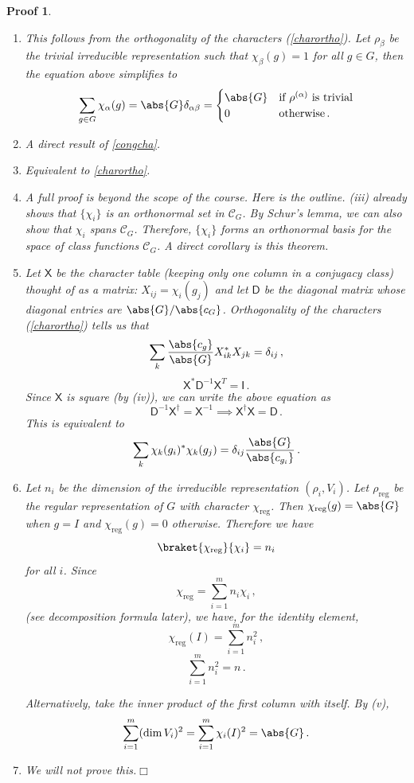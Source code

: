 \documentclass{article}
\theoremstyle{plain}\theoremheaderfont{\normalfont\itshape}\theorembodyfont{\rmfamily}\theoremseparator{.}\newtheorem*{rem}{Remark}\newtheorem*{ex}{Example}\newtheorem*{proof}{Proof}\newtheorem*{altp}{Alternative proof}
\theoremstyle{plain}\theoremheaderfont{\normalfont\bfseries}\theorembodyfont{\rmfamily}\theoremseparator{.}\newtheorem{thm}{Theorem}[section]\newtheorem{lem}[thm]{Lemma}\newtheorem{prop}[thm]{Proposition}\newtheorem*{cor}{Corollary}\newtheorem{defn}[thm]{Definition}\newtheorem{clm}[thm]{Claim}\newtheorem{clminproof}{Claim}
\theoremstyle{break}\theoremheaderfont{\normalfont\itshape}\theorembodyfont{\rmfamily}\theoremseparator{.\medskip}\newtheorem*{proofskip}{Proof}\newtheorem*{exs}{Examples}\newtheorem*{rems}{Remarks}
\theoremstyle{break}\theoremheaderfont{\normalfont\bfseries}\theorembodyfont{\rmfamily}\theoremseparator{.\medskip}\newtheorem{lemskip}[thm]{Lemma}\newtheorem{defnskip}[thm]{Definition}\newtheorem{propskip}[thm]{Proposition}\newtheorem{thmskip}[thm]{Theorem}
\numberwithin{equation}{section}
\newcommand{\qed}{\hfill\ensuremath{\Box}}
\begin{document}
	\begin{proofskip}
		\begin{enumerate}[topsep=0pt]
			\item This follows from the orthogonality of the characters (\cref{charortho}). Let \(\rho_\beta\) be the trivial irreducible representation such that \(\chi_\beta(g)=1\) for all \(g\in G\), then the equation above simplifies to
			\[\sum_{g\in G}\chi_\alpha(g)=\abs{G}\delta_{\alpha\beta}=\begin{cases}
				\abs{G} & \text{if } \rho^{(\alpha)} \text{ is trivial}\\
				0 & \text{otherwise}\,.
			\end{cases}\]
			\item A direct result of \cref{congcha}.
			\item Equivalent to \cref{charortho}.
			\item A full proof is beyond the scope of the course. Here is the outline. (iii) already shows that \(\{\chi_i\}\) is an orthonormal set in \(\mathcal{C}_G\). By Schur's lemma, we can also show that \(\chi_i\) spans \(\mathcal{C}_G\). Therefore, \(\{\chi_i\}\) forms an orthonormal basis for the space of class functions \(\mathcal{C}_G\). A direct corollary is this theorem.
			\item Let \(\mathsf{X}\) be the character table (keeping only one column in a conjugacy class) thought of as a matrix: \(X_{ij}=\chi_i(g_j)\) and let \(\mathsf{D}\) be the diagonal matrix whose diagonal entries are \(\abs{G}/\abs{c_G}\). Orthogonality of the characters (\cref{charortho}) tells us that
			\[\sum_k\frac{\abs{c_g}}{\abs{G}}X_{ik}^*X_{jk}=\delta_{ij}\,,\]
			\[\mathsf{X}^*\mathsf{D}^{-1}\mathsf{X}^T=\mathsf{I}\,.\]
			Since \(\mathsf{X}\) is square (by (iv)), we can write the above equation as
			\[\mathsf{D}^{-1}\mathsf{X}^\dagger=\mathsf{X}^{-1}\implies\mathsf{X}^\dagger\mathsf{X}=\mathsf{D}\,.\]
			This is equivalent to
			\[\sum_k\chi_k(g_i)^*\chi_k(g_j)=\delta_{ij}\frac{\abs{G}}{\abs{c_{g_i}}}\,.\]
			\item Let \(n_i\) be the dimension of the irreducible representation \((\rho_i,V_i)\). Let \(\rho_\text{reg}\) be the regular representation of \(G\) with character \(\chi_\text{reg}\). Then \(\chi_\text{reg}(g)=\abs{G}\) when \(g=I\) and \(\chi_\text{reg}(g)=0\) otherwise. Therefore we have
			\[\braket{\chi_\text{reg}}{\chi_i}=n_i\]
			for all \(i\). Since
			\[\chi_\text{reg}=\sum_{i=1}^{m}n_i\chi_i\,,\]
			(see decomposition formula later), we have, for the identity element,
			\[\chi_\text{reg}(I)=\sum_{i=1}^{m}n_i^2\,,\]
			\[\sum_{i=1}^{m}n_i^2=n\,.\]

			Alternatively, take the inner product of the first column with itself. By (v),
			\[\sum_{i=1}^{m}(\dim V_i)^2=\sum_{i=1}^{m}\chi_i(I)^2=\abs{G}\,.\]
			\item We will not prove this.\qed
		\end{enumerate}
	\end{proofskip}
\end{document}
